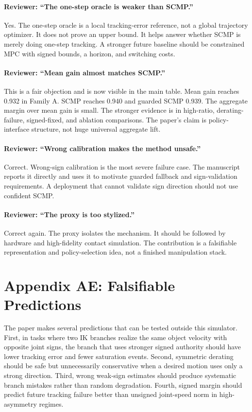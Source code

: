 \documentclass{article}
\begin{document}
\paragraph{Reviewer: ``The one-step oracle is weaker than SCMP.''}
Yes. The one-step oracle is a local tracking-error reference, not a global trajectory optimizer. It does not prove an upper bound. It helps answer whether SCMP is merely doing one-step tracking. A stronger future baseline should be constrained MPC with signed bounds, a horizon, and switching costs.

\paragraph{Reviewer: ``Mean gain almost matches SCMP.''}
This is a fair objection and is now visible in the main table. Mean gain reaches 0.932 in Family A. SCMP reaches 0.940 and guarded SCMP 0.939. The aggregate margin over mean gain is small. The stronger evidence is in high-ratio, derating-failure, signed-fixed, and ablation comparisons. The paper's claim is policy-interface structure, not huge universal aggregate lift.

\paragraph{Reviewer: ``Wrong calibration makes the method unsafe.''}
Correct. Wrong-sign calibration is the most severe failure case. The manuscript reports it directly and uses it to motivate guarded fallback and sign-validation requirements. A deployment that cannot validate sign direction should not use confident SCMP.

\paragraph{Reviewer: ``The proxy is too stylized.''}
Correct again. The proxy isolates the mechanism. It should be followed by hardware and high-fidelity contact simulation. The contribution is a falsifiable representation and policy-selection idea, not a finished manipulation stack.

\section*{Appendix AE: Falsifiable Predictions}

The paper makes several predictions that can be tested outside this simulator. First, in tasks where two IK branches realize the same object velocity with opposite joint signs, the branch that uses stronger signed authority should have lower tracking error and fewer saturation events. Second, symmetric derating should be safe but unnecessarily conservative when a desired motion uses only a strong direction. Third, wrong weak-sign estimates should produce systematic branch mistakes rather than random degradation. Fourth, signed margin should predict future tracking failure better than unsigned joint-speed norm in high-asymmetry regimes.
\end{document}
